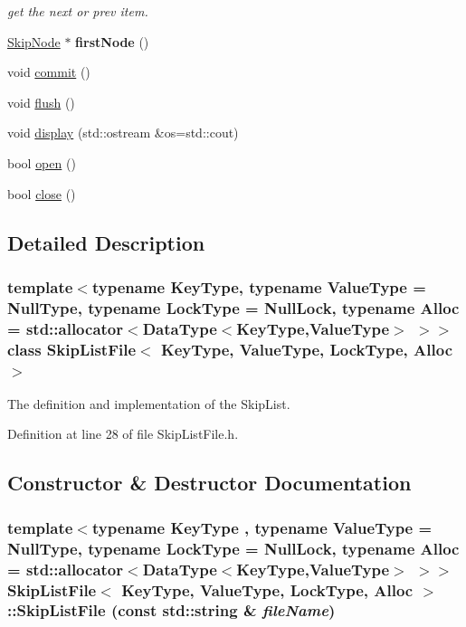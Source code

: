 \begin{CompactItemize}
\begin{CompactList}\small\item\em get the next or prev item. \item\end{CompactList}\item 
\hypertarget{classSkipListFile_af201857648c64edb8b91cadd16f70c4}{
\hyperlink{classSkipNode}{SkipNode} $\ast$ \textbf{firstNode} ()}
\label{classSkipListFile_af201857648c64edb8b91cadd16f70c4}

\item 
void \hyperlink{classSkipListFile_409e58415e91f6b4cbe9381fae50dc70}{commit} ()
\item 
void \hyperlink{classSkipListFile_7f6eb737975a52483087a649ecced807}{flush} ()
\item 
void \hyperlink{classSkipListFile_e794422745a92d67462d68c1b138bcc4}{display} (std::ostream \&os=std::cout)
\item 
bool \hyperlink{classSkipListFile_e9cd69cc2e8fd96c0c1c03ebb84b2853}{open} ()
\item 
bool \hyperlink{classSkipListFile_751dd7b2ee40cfb04a952131a3dec53d}{close} ()
\end{CompactItemize}


\subsection{Detailed Description}
\subsubsection*{template$<$typename KeyType, typename ValueType = NullType, typename LockType = NullLock, typename Alloc = std::allocator$<$DataType$<$KeyType,ValueType$>$ $>$$>$ class SkipListFile$<$ KeyType, ValueType, LockType, Alloc $>$}

The definition and implementation of the SkipList. 

Definition at line 28 of file SkipListFile.h.

\subsection{Constructor \& Destructor Documentation}
\hypertarget{classSkipListFile_7be7790d5ea16f3261db01afb62b55e1}{
\subsubsection[{SkipListFile}]{\setlength{\rightskip}{0pt plus 5cm}template$<$typename KeyType , typename ValueType  = NullType, typename LockType  = NullLock, typename Alloc  = std::allocator$<$DataType$<$KeyType,ValueType$>$ $>$$>$ {\bf SkipListFile}$<$ KeyType, ValueType, LockType, Alloc $>$::{\bf SkipListFile} (const std::string \& {\em fileName})}}
\label{classSkipListFile_7be7790d5ea16f3261db01afb62b55e1}


